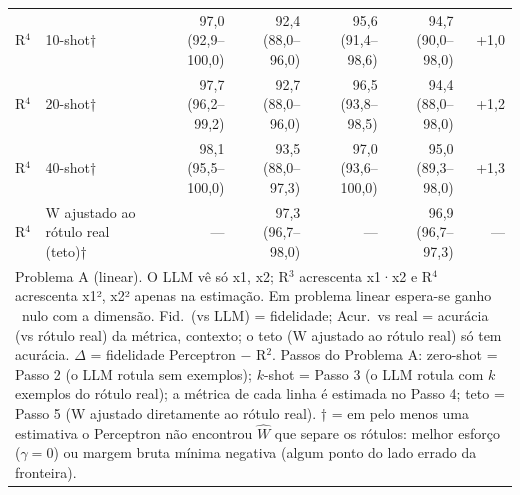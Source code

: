 \begin{table}[htbp]
\begin{tabular}{llrrrrr}
R$^4$ & 10-shot† & 97,0 (92,9–100,0) & 92,4 (88,0–96,0) & 95,6 (91,4–98,6) & 94,7 (90,0–98,0) & +1,0 \\
R$^4$ & 20-shot† & 97,7 (96,2–99,2) & 92,7 (88,0–96,0) & 96,5 (93,8–98,5) & 94,4 (88,0–98,0) & +1,2 \\
R$^4$ & 40-shot† & 98,1 (95,5–100,0) & 93,5 (88,0–97,3) & 97,0 (93,6–100,0) & 95,0 (89,3–98,0) & +1,3 \\
R$^4$ & W ajustado ao rótulo real (teto)† & — & 97,3 (96,7–98,0) & — & 96,9 (96,7–97,3) & — \\
\bottomrule
\multicolumn{7}{p{0.95\linewidth}}{\footnotesize Problema A (linear). O LLM vê só x1, x2; R$^3$ acrescenta x1·x2 e R$^4$ acrescenta x1², x2² apenas na estimação. Em problema linear espera-se ganho ~nulo com a dimensão. Fid.\ (vs LLM) = fidelidade; Acur.\ vs real = acurácia (vs rótulo real) da métrica, contexto; o teto (W ajustado ao rótulo real) só tem acurácia. $\Delta$ = fidelidade Perceptron $-$ R$^2$. Passos do Problema A: zero-shot = Passo 2 (o LLM rotula sem exemplos); $k$-shot = Passo 3 (o LLM rotula com $k$ exemplos do rótulo real); a métrica de cada linha é estimada no Passo 4; teto = Passo 5 (W ajustado diretamente ao rótulo real). † = em pelo menos uma estimativa o Perceptron não encontrou $\hat{W}$ que separe os rótulos: melhor esforço ($\gamma = 0$) ou margem bruta mínima negativa (algum ponto do lado errado da fronteira).} \\
\end{tabular}
\end{table}
